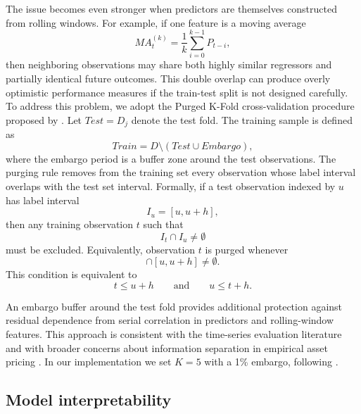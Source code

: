 \documentclass{rQUF2e}
\begin{document}
\noindent The issue becomes even stronger when predictors are themselves constructed from rolling windows. For example, if one feature is a moving average
\begin{equation}
MA_t^{(k)} = \frac{1}{k}\sum_{i=0}^{k-1}P_{t-i},
\end{equation}
\noindent then neighboring observations may share both highly similar regressors and partially identical future outcomes. This double overlap can produce overly optimistic performance measures if the train-test split is not designed carefully. \\

\noindent To address this problem, we adopt the Purged K-Fold cross-validation procedure proposed by \citet{lopez2018advances}. Let \(Test = D_j\) denote the test fold. The training sample is defined as
\begin{equation}
Train = D \setminus (Test \cup Embargo),
\end{equation}
\noindent where the embargo period is a buffer zone around the test observations. The purging rule removes from the training set every observation whose label interval overlaps with the test set interval. Formally, if a test observation indexed by \(u\) has label interval
\begin{equation}
I_u = [u,u+h],
\end{equation}
then any training observation \(t\) such that
\begin{equation}
I_t \cap I_u \neq \emptyset
\end{equation}
must be excluded. Equivalently, observation \(t\) is purged whenever
\begin{equation}
[t,t+h]\cap[u,u+h]\neq\emptyset.
\end{equation}
This condition is equivalent to
\begin{equation}
t \leq u+h
\qquad \text{and} \qquad
u \leq t+h.
\end{equation}

\noindent An embargo buffer around the test fold provides additional protection against residual dependence from serial correlation in predictors and rolling-window features. This approach is consistent with the time-series evaluation literature \citep{bergmeir2012use,bergmeir2018note,cerqueira2020evaluating} and with broader concerns about information separation in empirical asset pricing \citep{gu2020empirical}. In our implementation we set $K=5$ with a 1\% embargo, following \citet{lopez2018advances}.

\subsection{Model interpretability}
\end{document}
